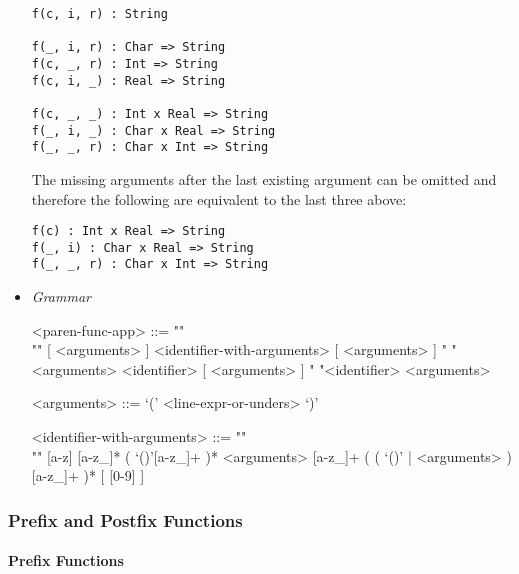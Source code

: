 \documentclass{article}
\begin{document}
\begin{itemize}
\begin{verbatim}
f(c, i, r) : String

f(_, i, r) : Char => String
f(c, _, r) : Int => String
f(c, i, _) : Real => String

f(c, _, _) : Int x Real => String
f(_, i, _) : Char x Real => String
f(_, _, r) : Char x Int => String
\end{verbatim}

The missing arguments after the last existing argument can be omitted and therefore
the following are equivalent to the last three above:

\begin{verbatim}
f(c) : Int x Real => String
f(_, i) : Char x Real => String
f(_, _, r) : Char x Int => String
\end{verbatim}

\item \textit{Grammar}
\begin{grammar}
<paren-func-app> ::= ""\\""
[ <arguments> ] <identifier-with-arguments> [ <arguments> ]
\alt " "<arguments> <identifier> [ <arguments> ]
\alt " "<identifier> <arguments>

<arguments> ::= `(' <line-expr-or-unders> `)'

<identifier-with-arguments> ::= ""\\""
[a-z] [a-z_]* ( `()'[a-z_]+ )* <arguments>
[a-z_]+ ( ( `()' | <arguments> ) [a-z_]+ )* 
[ [0-9] ]
\end{grammar}

\end{itemize}

\subsubsection{Prefix and Postfix Functions}
 
\paragraph{Prefix Functions}
\end{document}
